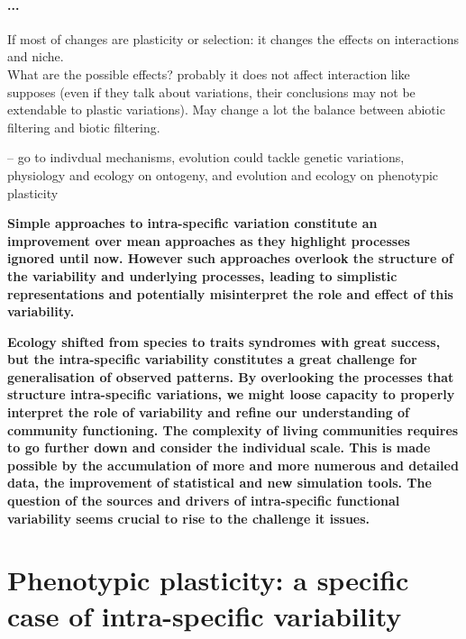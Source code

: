 \paragraph{...}
If most of changes are plasticity or selection: it changes the effects on interactions and niche.\\
What are the possible effects? probably it does not affect interaction like \parencite{hart_how_2016} supposes (even if they talk about variations, their conclusions may not be extendable to plastic variations). May change a lot the balance between abiotic filtering and biotic filtering. 

-- go to indivdual mechanisms, evolution could tackle genetic variations, physiology and ecology on ontogeny, and evolution and ecology on phenotypic plasticity


\textbf{Simple approaches to intra-specific variation constitute an improvement over mean approaches as they highlight processes ignored until now. However such approaches overlook the structure of the variability and underlying processes, leading to simplistic representations and potentially misinterpret the role and effect of this variability.}


\textbf{%
Ecology shifted from species to traits syndromes with great success, but the intra-specific variability constitutes a great challenge for generalisation of observed patterns. By overlooking the processes that structure intra-specific variations, we might loose capacity to properly interpret the role of variability and refine our understanding of community functioning. The complexity of living communities requires to go further down and consider the individual scale. This is made possible by the accumulation of more and more numerous and detailed data, the improvement of statistical and new simulation tools. The question of the sources and drivers of intra-specific functional variability seems crucial to rise to the challenge it issues.}



\section{Phenotypic plasticity: a specific case of intra-specific variability}

